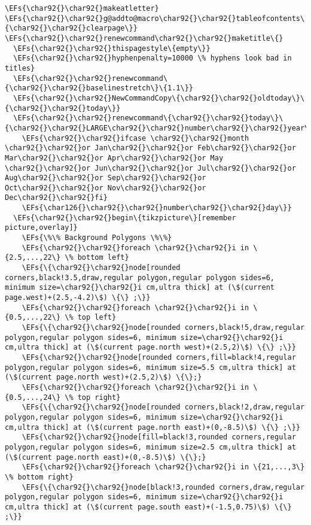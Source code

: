 \documentclass{article}
\newcommand{\EFs}[1]{\textcolor{EFs}{#1}} %
\begin{document}
\begin{Code}
\begin{Verbatim}
\EFs{\char92{}\char92{}makeatletter}
\EFs{\char92{}\char92{}g@addto@macro\char92{}\char92{}tableofcontents\{\char92{}\char92{}clearpage\}}
\EFs{\char92{}\char92{}renewcommand\char92{}\char92{}maketitle\{}
  \EFs{\char92{}\char92{}thispagestyle\{empty\}}
  \EFs{\char92{}\char92{}hyphenpenalty=10000 \% hyphens look bad in titles}
  \EFs{\char92{}\char92{}renewcommand\{\char92{}\char92{}baselinestretch\}\{1.1\}}
  \EFs{\char92{}\char92{}NewCommandCopy\{\char92{}\char92{}oldtoday\}\{\char92{}\char92{}today\}}
  \EFs{\char92{}\char92{}renewcommand\{\char92{}\char92{}today\}\{\char92{}\char92{}LARGE\char92{}\char92{}number\char92{}\char92{}year\char92{}\char92{}\char92{}\char92{}\char92{}\char92{}large\%}
    \EFs{\char92{}\char92{}ifcase \char92{}\char92{}month \char92{}\char92{}or Jan\char92{}\char92{}or Feb\char92{}\char92{}or Mar\char92{}\char92{}or Apr\char92{}\char92{}or May \char92{}\char92{}or Jun\char92{}\char92{}or Jul\char92{}\char92{}or Aug\char92{}\char92{}or Sep\char92{}\char92{}or Oct\char92{}\char92{}or Nov\char92{}\char92{}or Dec\char92{}\char92{}fi}
    \EFs{\char126{}\char92{}\char92{}number\char92{}\char92{}day\}}
  \EFs{\char92{}\char92{}begin\{tikzpicture\}[remember picture,overlay]}
    \EFs{\%\% Background Polygons \%\%}
    \EFs{\char92{}\char92{}foreach \char92{}\char92{}i in \{2.5,...,22\} \% bottom left}
    \EFs{\{\char92{}\char92{}node[rounded corners,black!3.5,draw,regular polygon,regular polygon sides=6, minimum size=\char92{}\char92{}i cm,ultra thick] at (\$(current page.west)+(2.5,-4.2)\$) \{\} ;\}}
    \EFs{\char92{}\char92{}foreach \char92{}\char92{}i in \{0.5,...,22\} \% top left}
    \EFs{\{\char92{}\char92{}node[rounded corners,black!5,draw,regular polygon,regular polygon sides=6, minimum size=\char92{}\char92{}i cm,ultra thick] at (\$(current page.north west)+(2.5,2)\$) \{\} ;\}}
    \EFs{\char92{}\char92{}node[rounded corners,fill=black!4,regular polygon,regular polygon sides=6, minimum size=5.5 cm,ultra thick] at (\$(current page.north west)+(2.5,2)\$) \{\};}
    \EFs{\char92{}\char92{}foreach \char92{}\char92{}i in \{0.5,...,24\} \% top right}
    \EFs{\{\char92{}\char92{}node[rounded corners,black!2,draw,regular polygon,regular polygon sides=6, minimum size=\char92{}\char92{}i cm,ultra thick] at (\$(current page.north east)+(0,-8.5)\$) \{\} ;\}}
    \EFs{\char92{}\char92{}node[fill=black!3,rounded corners,regular polygon,regular polygon sides=6, minimum size=2.5 cm,ultra thick] at (\$(current page.north east)+(0,-8.5)\$) \{\};}
    \EFs{\char92{}\char92{}foreach \char92{}\char92{}i in \{21,...,3\} \% bottom right}
    \EFs{\{\char92{}\char92{}node[black!3,rounded corners,draw,regular polygon,regular polygon sides=6, minimum size=\char92{}\char92{}i cm,ultra thick] at (\$(current page.south east)+(-1.5,0.75)\$) \{\} ;\}}

\end{Verbatim}
\end{Code}
\end{document}
